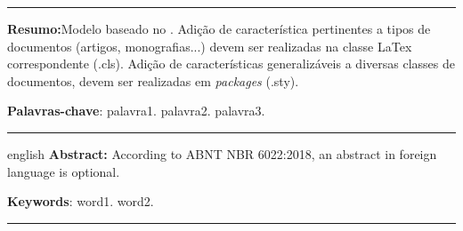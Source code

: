 \documentclass[
	article,			%
	11pt,				%
	oneside,			%
	a4paper,			%
	chapter=TITLE,		%
	section=TITLE,		%
	subsection=TITLE,	%
	subsubsection=TITLE, %
	english,			%
	brazil,				%
	sumario=tradicional
	]{ifrs-farr-artigo-abntex2}
\begin{document}

\frenchspacing 


%
%

\imprimircapa
\hrule
\renewcommand{\resumoname}{}
\begin{resumo}
\textbf{Resumo:}Modelo baseado no . Adição de característica pertinentes a tipos de documentos (artigos, monografias...) devem ser realizadas na classe LaTex correspondente (.cls). Adição de características generalizáveis a diversas classes de documentos, devem ser realizadas em \textit{packages} (.sty).
 
 \vspace{\onelineskip}
 
 \noindent
 \textbf{Palavras-chave}: palavra1. palavra2. palavra3.
\end{resumo}
\hrule

\renewcommand{\resumoname}{}
\begin{resumoumacoluna}
 \begin{otherlanguage*}{english}
   \textbf{Abstract:} According to ABNT NBR 6022:2018, an abstract in foreign language is optional.

   \vspace{\onelineskip}
 
   \noindent
   \textbf{Keywords}: word1. word2.
 \end{otherlanguage*}  
\end{resumoumacoluna}
\hrule


%
\end{document}
